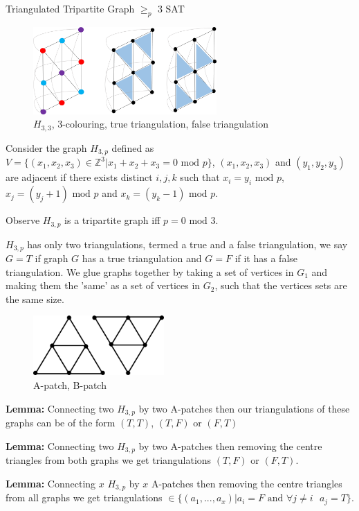 \documentclass[final]{beamer}
\newlength{\colwidth}
\newcounter{col}
\begin{document}
\begin{frame}[t]
\begin{columns}[t]
\begin{column}{\colwidth}
\begin{block}{Triangulated Tripartite Graph $\geq_p$ 3 SAT}
\begin{figure}
		\includegraphics[width=70mm]{holyer_graph.png}
		\caption{$H_{3,3}$, 3-colouring, true triangulation, false triangulation}
\end{figure}

Consider the graph $H_{3,p}$ defined as $V=\{(x_1,x_2,x_3)\in \mathbb{Z}^3|x_1+x_2+x_3=0\text{ mod }p \}$, $(x_1,x_2,x_3)$ and $(y_1,y_2,y_3)$ are adjacent if there exists distinct $i,j,k$ such that $x_i=y_i \text{ mod }p $, $x_j=(y_j+1) \text{ mod }p $ and $x_k=(y_k-1) \text{ mod }p $.

Observe $H_{3,p}$ is a tripartite graph iff $p=0 \text{ mod }3$.

$H_{3,p}$ has only two triangulations, termed a true and a false triangulation, we say $G=T$ if graph $G$ has a true triangulation and $G=F$ if it has a false triangulation. We glue graphs together by taking a set of vertices in $G_1$ and making them the 'same' as a set of vertices in $G_2$, such that the vertices sets are the same size.

\begin{figure}
		\includegraphics[width=50mm]{patches.png}
		\caption{A-patch, B-patch}
\end{figure}

\textbf{Lemma:} Connecting two $H_{3,p}$ by two A-patches then our triangulations of these graphs can be of the form $(T,T)$, $(T,F)$ or $(F,T)$

\textbf{Lemma:} Connecting two $H_{3,p}$ by two A-patches then removing the centre triangles from both graphs we get triangulations $(T,F)$ or $(F,T)$.

\textbf{Lemma:} Connecting $x$ $H_{3,p}$ by $x$ A-patches then removing the centre triangles from all graphs we get triangulations $\in \{(a_1,...,a_x)| a_i=F\text{ and } \forall j\neq i\text{ } a_j=T \}$.


\end{block}
\end{column}
\end{columns}
\end{frame}
\end{document}
